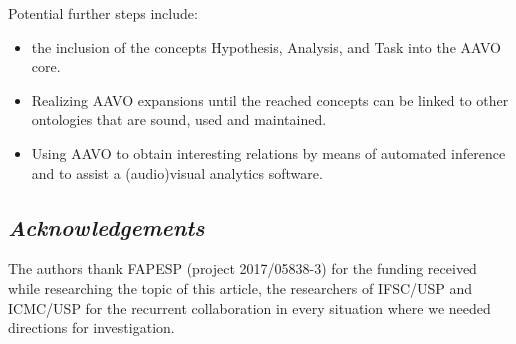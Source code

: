\documentclass[12pt,fleqn]{article}
\begin{document}
Potential further steps include:
\begin{itemize}
	\item the inclusion of the concepts Hypothesis, Analysis, and Task
		into the AAVO core.
	\item Realizing AAVO expansions until the reached concepts can be linked
		to other ontologies that are sound, used and maintained.
	\item Using AAVO to obtain interesting relations by means of automated
		inference and to assist a (audio)visual analytics software.
\end{itemize}



\subsection*{\textit{Acknowledgements}}
The authors thank FAPESP (project 2017/05838-3) for the funding received while researching the topic of this article, the researchers of IFSC/USP and ICMC/USP for the recurrent collaboration in every situation
where we needed directions for investigation.
\end{document}
